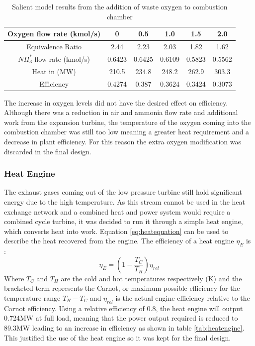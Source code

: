 \documentclass[11pt, oneside]{article}
\begin{document}
\begin {table} [h]
\begin{center}
\caption{Salient model results from the addition of waste oxygen to combustion chamber} \label{tab:extraox} 
\begin{tabular}{ |c|c|c|c|c|c| }
 \hline
  Oxygen flow rate (kmol/s) & 0 & 0.5 & 1.0 & 1.5 & 2.0\\ 
   \hline
  Equivalence Ratio & 2.44 & 2.23 & 2.03 & 1.82 & 1.62\\
    \hline
  $NH_3^*$ flow rate (kmol/s) & 0.6423 & 0.6425 & 0.6109 & 0.5823 & 0.5562\\ 
    \hline
  Heat in (MW) & 210.5 & 234.8 & 248.2 & 262.9 & 303.3 \\
  \hline
  Efficiency & 0.4274 & 0.387 & 0.3624 & 0.3424 & 0.3073\\ 
 \hline
\end{tabular}
\end{center}  
\end {table} 
The increase in oxygen levels did not have the desired effect on efficiency. Although there was a reduction in air and ammonia flow rate and additional work from the expansion turbine, the temperature of the oxygen coming into the combustion chamber was still too low meaning a greater heat requirement and a decrease in plant efficiency. For this reason the extra oxygen modification was discarded in the final design.


\subsubsection{Heat Engine}
The exhaust gases coming out of the low pressure turbine still hold significant energy due to the high temperature. As this stream cannot be used in the heat exchange network and a combined heat and power system would require a combined cycle turbine, it was decided to run it through a simple heat engine, which converts heat into work. Equation \ref{eq:heatequation} can be used to describe the heat recovered from the engine. The efficiency of a heat engine $\eta_E$ is \cite{thermonotes}:
\begin{equation}
\eta_E = (1 - \frac{T_C}{T_H}) \eta_{rel} 
\end{equation}
Where $T_C$ and $T_H$ are the cold and hot temperatures respectively (K) and the bracketed term represents the Carnot, or maximum possible efficiency for the temperature range $T_H - T_C$ and $\eta_{rel}$ is the actual engine efficiency relative to the Carnot efficiency. Using a relative efficiency of 0.8, the heat engine will output 0.724MW at full load, meaning that the power output required is reduced to 89.3MW leading to an increase in efficiency as shown in table \ref{tab:heatengine}. This justified the use of the heat engine so it was kept for the final design.
\end{document}
